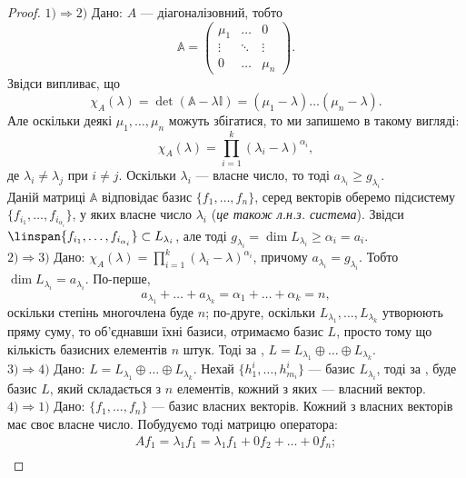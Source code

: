 \documentclass{math_library}
\begin{document}
\begin{proof}
$\boxed{1) \Rightarrow 2)}$ Дано: $A$ --- діагоналізовний, тобто
\[ 
\mathbb{A} = \begin{pmatrix}
\mu_1 & \dots & 0 \\
\vdots & \ddots & \vdots \\
0 & \dots & \mu_n
\end{pmatrix}.
\]
Звідси випливає, що 
\[
\chi_A(\lambda) = \det (\mathbb{A}-\lambda \mathbb{I}) = (\mu_1 - \lambda) \dots (\mu_n - \lambda).
\]
Але оскільки деякі $\mu_1,\dots,\mu_n$ можуть збігатися, то ми запишемо в такому вигляді:\\
\[
\chi_A(\lambda) = \displaystyle\prod_{i=1}^k (\lambda_i - \lambda)^{\alpha_i},
\]
де $\lambda_i \neq \lambda_j$ при $i \neq j$. Оскільки $\lambda_i$ --- власне число, то тоді $a_{\lambda_i} \geq g_{\lambda_i}$.\\
Даній матриці $\mathbb{A}$ відповідає базис $\{f_1,\dots,f_n\}$, серед векторів оберемо підсистему $\{f_{i_1},\dots,f_{i_{\alpha_i}}\}$, у яких власне число $\lambda_i$ (\textit{це також л.н.з. система}). Звідси $\linspan \{f_{i_1},\dots,f_{i_{\alpha_i}}\} \subset L_{\lambda_i}$, але тоді $g_{\lambda_i} = \dim L_{\lambda_i} \geq \alpha_i = a_i$.
\bigskip \\
$\boxed{2) \Rightarrow 3)}$ Дано: $\chi_A(\lambda) = \displaystyle\prod_{i=1}^k (\lambda_i - \lambda)^{\alpha_i}$, причому $a_{\lambda_i} = g_{\lambda_i}$. Тобто $\dim L_{\lambda_i} = a_{\lambda_i}$. По-перше, 
\[
a_{\lambda_1} + \dots + a_{\lambda_k} = \alpha_1 + \dots + \alpha_k = n,
\]
оскільки степінь многочлена буде $n$; по-друге, оскільки $L_{\lambda_1},\dots, L_{\lambda_k}$ утворюють пряму суму, то об'єднавши їхні базиси, отримаємо базис $L$, просто тому що кількість базисних елементів $n$ штук. Тоді за , $L = L_{\lambda_1} \oplus \dots \oplus L_{\lambda_k}$.
\bigskip \\
$\boxed{3) \Rightarrow 4)}$ Дано: $L = L_{\lambda_1} \oplus \dots \oplus L_{\lambda_k}$. Нехай $\{h_1^i,\dots,h^i_{m_i}\}$ --- базис $L_{\lambda_i}$, тоді за , буде базис $L$, який складається з $n$ елементів, кожний з яких --- власний вектор.
\bigskip \\
$\boxed{4) \Rightarrow 1)}$ Дано: $\{f_1,\dots,f_n\}$ --- базис власних векторів. Кожний з власних векторів має своє власне число. Побудуємо тоді матрицю оператора:
\begin{align*}
Af_1 = \lambda_1 f_1 = \lambda_1 f_1 + 0 f_2 + \dots + 0 f_n;\\

\end{align*}
\end{proof}
\end{document}
